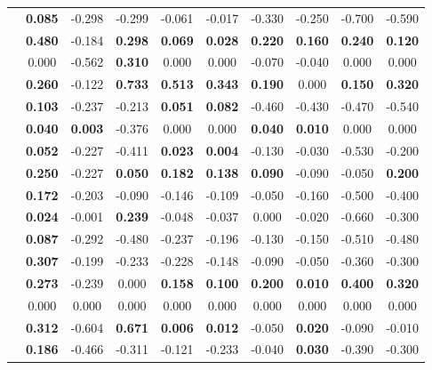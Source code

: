\begin{table}
\begin{tabular}{p{3cm}c|cccc|cccc}
		\centering{Cervical Myelopathy} & \textbf{0.085} &  -0.298 &  -0.299 &  -0.061 &  -0.017 &  -0.330 &  -0.250 &  -0.700 &  -0.590 \\
		\centering{Drones in Agriculture} & \textbf{0.480} &  -0.184 & \textbf{0.298} & \textbf{0.069} & \textbf{0.028} & \textbf{0.220} & \textbf{0.160} & \textbf{0.240} & \textbf{0.120} \\
		\centering{Tourism Growth Nexus} & 0.000 &  -0.562 & \textbf{0.310} & 0.000 & 0.000 &  -0.070 &  -0.040 & 0.000 & 0.000 \\
		\centering{Sustainable Biofuel Economy} & \textbf{0.260} &  -0.122 & \textbf{0.733} & \textbf{0.513} & \textbf{0.343} & \textbf{0.190} & 0.000 & \textbf{0.150} & \textbf{0.320} \\
		\centering{Perovskite Solar Cells Stability} & \textbf{0.103} &  -0.237 &  -0.213 & \textbf{0.051} & \textbf{0.082} &  -0.460 &  -0.430 &  -0.470 &  -0.540 \\
		\centering{Nanopharmaceuticals OR Nanonutraceuticals} & \textbf{0.040} & \textbf{0.003} &  -0.376 & 0.000 & 0.000 & \textbf{0.040} & \textbf{0.010} & 0.000 & 0.000 \\
		\centering{Green Warehousing} & \textbf{0.052} &  -0.227 &  -0.411 & \textbf{0.023} & \textbf{0.004} &  -0.130 &  -0.030 &  -0.530 &  -0.200 \\
		\centering{AI on Edge Devices} & \textbf{0.250} &  -0.227 & \textbf{0.050} & \textbf{0.182} & \textbf{0.138} & \textbf{0.090} &  -0.090 &  -0.050 & \textbf{0.200} \\
		\centering{Internet of Things in Healthcare} & \textbf{0.172} &  -0.203 &  -0.090 &  -0.146 &  -0.109 &  -0.050 &  -0.160 &  -0.500 &  -0.400 \\
		\centering{Software Process Line} & \textbf{0.024} &  -0.001 & \textbf{0.239} &  -0.048 &  -0.037 & 0.000 &  -0.020 &  -0.660 &  -0.300 \\
		\centering{Data Stream Processing Latency} & \textbf{0.087} &  -0.292 &  -0.480 &  -0.237 &  -0.196 &  -0.130 &  -0.150 &  -0.510 &  -0.480 \\
		\centering{Business Process Meta Models} & \textbf{0.307} &  -0.199 &  -0.233 &  -0.228 &  -0.148 &  -0.090 &  -0.050 &  -0.360 &  -0.300 \\
		\centering{Multicore Performance Prediction} & \textbf{0.273} &  -0.239 & 0.000 & \textbf{0.158} & \textbf{0.100} & \textbf{0.200} & \textbf{0.010} & \textbf{0.400} & \textbf{0.320} \\
		\centering{Cloud Migration} & 0.000 & 0.000 & 0.000 & 0.000 & 0.000 & 0.000 & 0.000 & 0.000 & 0.000 \\
		\centering{Software Fault Prediction Metrics} & \textbf{0.312} &  -0.604 & \textbf{0.671} & \textbf{0.006} & \textbf{0.012} &  -0.050 & \textbf{0.020} &  -0.090 &  -0.010 \\
		\centering{Software Defect Prediction} & \textbf{0.186} &  -0.466 &  -0.311 &  -0.121 &  -0.233 &  -0.040 & \textbf{0.030} &  -0.390 &  -0.300 \\
	\end{tabular}\label{table:expirment-1}
\end{table}


